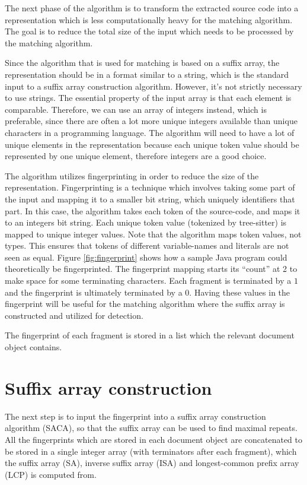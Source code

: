 The next phase of the algorithm is to transform the extracted source code into a
representation which is less computationally heavy for the matching algorithm. The goal is
to reduce the total size of the input which needs to be processed by the matching
algorithm.

Since the algorithm that is used for matching is based on a suffix array, the
representation should be in a format similar to a string, which is the standard input to a
suffix array construction algorithm. However, it's not strictly necessary to use strings.
The essential property of the input array is that each element is comparable. Therefore,
we can use an array of integers instead, which is preferable, since there are often a lot
more unique integers available than unique characters in a programming language. The
algorithm will need to have a lot of unique elements in the representation because each
unique token value should be represented by one unique element, therefore integers are a
good choice.


The algorithm utilizes fingerprinting in order to reduce the size of the representation.
Fingerprinting is a technique which involves taking some part of the input and mapping it
to a smaller bit string, which uniquely identifiers that part. In this case, the algorithm
takes each token of the source-code, and maps it to an integers bit string. Each unique
token value (tokenized by tree-sitter) is mapped to unique integer values. Note that the
algorithm maps token values, not types. This ensures that tokens of different
variable-names and literals are not seen as equal. Figure \ref{fig:fingerprint} shows how
a sample Java program could theoretically be fingerprinted. The fingerprint mapping starts
its ``count'' at 2 to make space for some terminating characters. Each fragment is
terminated by a $1$ and the fingerprint is ultimately terminated by a $0$. Having these
values in the fingerprint will be useful for the matching algorithm where the suffix array
is constructed and utilized for detection.

The fingerprint of each fragment is stored in a list which the relevant document object
contains.



\section{Suffix array construction}

The next step is to input the fingerprint into a suffix array construction algorithm
(SACA), so that the suffix array can be used to find maximal repeats. All the fingerprints
which are stored in each document object are concatenated to be stored in a single integer
array (with terminators after each fragment), which the suffix array (SA), inverse suffix
array (ISA) and longest-common prefix array (LCP) is computed from.

